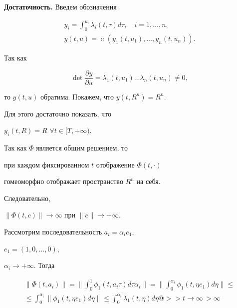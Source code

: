 \begin{pf}


{\bf Достаточность.} Введем обозначения


\begin{gather*}


y_{i}=\int^{u_{i}}_{0}\lambda_{i}(t,\tau)d\tau,\quad i=1,\dotsc,n, \\


y(t,u)=\Colon(y_{1}(t,u_{1}),\dotsc,y_{n}(t,u_{n})).


\end{gather*}


Так как


$$


\det\frac{\partial y}{\partial u}=\lambda_{1}(t,u_{1})


\dotsc\lambda_{n}(t,u_{n})\neq 0,


$$


то $y(t,u)$ обратима. Покажем, что $y(t,R^{n})=R^{n}$.


Для этого достаточно показать, что


$y_{i}(t,R)=R$ $\forall t\in [T,+\infty)$.


Так как $\Phi$ является общим решением, то


при каждом фиксированном $t$ отображение $\Phi(t,\cdot)$ 


гомеоморфно отображает пространство $R^{n}$ на себя.


Следовательно,


$\|\Phi(t,c)\|\rightarrow \infty$ при $\|c\|\rightarrow +\infty$.


Рассмотрим последовательность $a_{i}=\alpha_{i}e_{1}$,


$e_{1}=(1,0,\dotsc,0)$,


$\alpha_{i}\rightarrow +\infty$. Тогда


\begin{multline}


\label{ner1}


\|\Phi(t,a_{i})\|=\bigg\|\int_{0}^{1}\phi_{1}(t,a_{i}\tau)d\tau\alpha_{i}


\bigg\|=\bigg\|\int_{0}^{\alpha_{i}}\phi_{1}(t,\eta e_{1})d\eta\bigg\|\leq\\


\le\int_{0}^{\alpha_{i}}\|\phi_{1}(t,\eta e_{1})d\eta\|\leq


\int_{0}^{\alpha_{i}}\lambda_{1}(t,\eta)d\eta@>>{t\to\infty\,}>\infty


\end{multline}



\end{pf}
